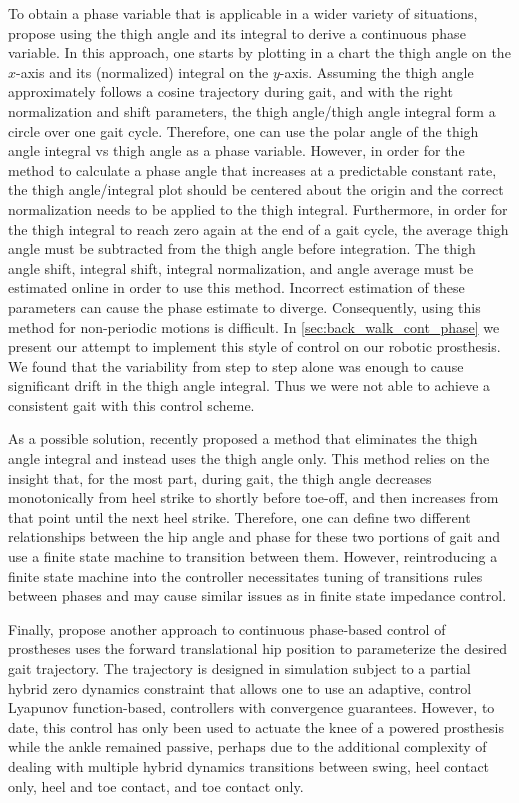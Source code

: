 To obtain a phase variable that is applicable in a wider variety of situations,
\citet{quintero2016preliminary} propose using the thigh angle and its integral
to derive a continuous phase variable. In this approach, one starts by plotting
in a chart the thigh angle on the $x$-axis and its (normalized) integral on the
$y$-axis. Assuming the thigh angle approximately follows a cosine trajectory
during gait, and with the right normalization and shift parameters, the thigh
angle/thigh angle integral form a circle over one gait cycle. Therefore, one can
use the polar angle of the thigh angle integral vs thigh angle as a phase
variable.  However, in order for the method to calculate a phase angle that
increases at a predictable constant rate, the thigh angle/integral plot should
be centered about the origin and the correct normalization needs to be applied
to the thigh integral.  Furthermore, in order for the thigh integral to reach
zero again at the end of a gait cycle, the average thigh angle must be
subtracted from the thigh angle before integration. The thigh angle shift,
integral shift, integral normalization, and angle average must be estimated
online in order to use this method. Incorrect estimation of these parameters can
cause the phase estimate to diverge. Consequently, using this method for
non-periodic motions is difficult.  In \cref{sec:back_walk_cont_phase} we
present our attempt to implement this style of control on our robotic
prosthesis. We found that the variability from step to step alone was enough to
cause significant drift in the thigh angle integral.  Thus we were not able to
achieve a consistent gait with this control scheme.

As a possible solution, \citet{rezazadeh2018phase} recently proposed a method
that eliminates the thigh angle integral and instead uses the thigh angle only.
This method relies on the insight that, for the most part, during gait, the
thigh angle decreases monotonically from heel strike to shortly before toe-off,
and then increases from that point until the next heel strike. Therefore, one
can define two different relationships between the hip angle and phase for these
two portions of gait and use a finite state machine to transition between them.
However, reintroducing a finite state machine into the controller necessitates
tuning of transitions rules between phases and may cause similar issues as in
finite state impedance control.

Finally, \citet{azimi2019model} propose another approach to continuous
phase-based control of prostheses uses the forward translational hip position to
parameterize the desired gait trajectory. The trajectory is designed in
simulation subject to a partial hybrid zero dynamics constraint that allows one
to use an adaptive, control Lyapunov function-based, controllers with convergence
guarantees. However, to date, this control has only been used to actuate the
knee of a powered prosthesis while the ankle remained passive, perhaps due to
the additional complexity of dealing with multiple hybrid dynamics transitions
between swing, heel contact only, heel and toe contact, and toe contact only.

